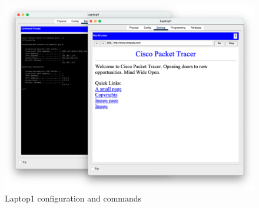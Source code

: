 \documentclass[11pt,a4paper]{report}
\begin{document}
        \begin{figure}[h]
            \centering
            \includegraphics[scale=0.40]{Laptop1}
            \caption{Laptop1 configuration and commands}
            \label{tab:laptop1conf}
        \end{figure}
\end{document}
